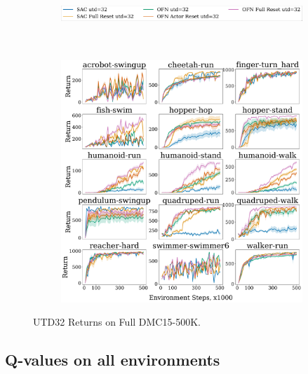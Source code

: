 \begin{figure}[H]
\centering
    \begin{subfigure}[b]{0.8\textwidth}
        \centering
        \includegraphics[height=0.8cm]{figures/dissecting/main_exp/utd_32_return_legend.pdf}
    \end{subfigure}\\%
    \begin{subfigure}[b]{1\textwidth}
        \centering
        \includegraphics[width=15cm, trim=0cm 0cm 0cm 0cm ,clip]{figures/dissecting/main_exp/utd_32_return.pdf}
    \end{subfigure}%
    \caption{UTD32 Returns on Full DMC15-500K.}
    \label{fig:utd32_ret}
\end{figure}


\subsection{Q-values on all environments} \label{app:exp_q}

